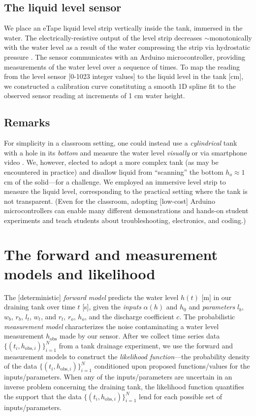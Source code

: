 \documentclass[a4paper,fleqn]{cas-dc}
\newcommand\thedata {$\{(t_i,h_{\text{obs}, i})\}_{i=1}^{N}$\xspace}
\begin{document}
\subsection{The liquid level sensor}
We place an eTape\texttrademark\xspace liquid level strip vertically inside the tank, immersed in the water. 
The electrically-resistive output of the level strip decreases $\sim$monotonically with the water level as a result of the water compressing the strip via hydrostatic pressure \cite{eTape}.
The sensor communicates with an Arduino microcontroller, providing measurements of the water level over a sequence of times. 
To map the reading from the level sensor [0-1023 integer values] to the liquid level in the tank [cm], we constructed a calibration curve constituting a smooth 1D spline fit to the observed sensor reading at increments of 1 cm water height.

\subsection{Remarks}
For simplicity in a classroom setting, one could instead use a \emph{cylindrical} tank with a hole in its \emph{bottom} and measure the water level \emph{visually} or via smartphone video \cite{brown2009innovative,klein2015video}. We, however, elected to adopt a more complex tank (as may be encountered in practice) and disallow liquid from ``scanning'' the bottom $h_o \approx 1$\,cm of the solid---for a challenge. We employed an immersive level strip to measure the liquid level, corresponding to the practical setting where the tank is not transparent. (Even for the classroom, adopting [low-cost] Arduino microcontrollers can enable many different demonstrations and hands-on student experiments \cite{kubinova2015chemduino,kang2019applying,pino2018measuring} and teach students about troubleshooting, electronics, and coding.) 


\section{The forward and measurement models and likelihood}
The [deterministic] \emph{forward model} predicts the water level $h(t)$ [m] in our draining tank over time $t$ [s], given the \emph{inputs} $\alpha(h)$ and $h_0$ and \emph{parameters}  $l_b$, $w_b$, $r_b$, $l_t$, $w_t$, and $r_t$, $r_o$, $h_o$, and the discharge coefficient $c$. 
The probabilistic \emph{measurement model} characterizes the noise contaminating a water level measurement $h_{\text{obs}}$ made by our sensor.
After we collect time series data \thedata from a tank drainage experiment, we use the forward and measurement models to construct the \emph{likelihood function}---the probability density of the data \thedata conditioned upon proposed functions/values for the inputs/parameters. 
When any of the inputs/parameters are uncertain in an inverse problem concerning the draining tank, the likelihood function quantifies the support that the data \thedata lend for each possible set of inputs/parameters.
\end{document}
